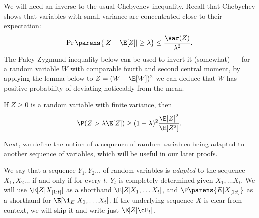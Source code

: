 \documentclass[11pt]{article}
\begin{document}
We will need an inverse to the usual Chebychev inequality. Recall that Chebychev shows that variables with small variance are concentrated close to their expectation:
\[\Pr\parens{|Z-\E[Z]|\ge \lambda}\le \frac{\Var(Z)}{\lambda^2}.\] 
The Paley-Zygmund inequality below can be used to invert it (somewhat) --- for a random variable $W$ with comparable fourth and second central moment, by applying the lemma below to $Z = (W - \E[W])^2$ we can deduce that $W$ has positive probability of deviating noticeably from the mean.
\begin{lemma}
	\label{lem:paley-zygmund}
	If $Z \geq 0$ is a random variable with finite variance, then
	\begin{equation*}
		\P(Z > \lambda \E[Z]) \geq (1 - \lambda)^2 \frac{\E[Z]^2}{\E[Z^2]}.
	\end{equation*}
\end{lemma}

Next, we define the notion of a sequence of random variables being adapted to another sequence of variables, which will be useful in our later proofs.

\begin{definition}
	\label{def:adapted-sequence}
	We say that a sequence $Y_1, Y_2 \ldots$ of random variables is \emph{adapted} to the sequence $X_1, X_2 \ldots$ if and only if for every $t$,  $Y_t$ is completely determined given $X_1, \ldots X_t$. We will use $\E[Z | X_{[1:t]}]$ as a shorthand $\E[Z | X_1, \ldots X_t]$, and $\P\parens{ E | X_{[1:t]}}$ as a shorthand for $\E[\1_E | X_1, \ldots X_t]$. If the  underlying sequence $X$ is clear from context, we will skip it and write just $\E[Z | \cF_t]$.
\end{definition}
\end{document}
